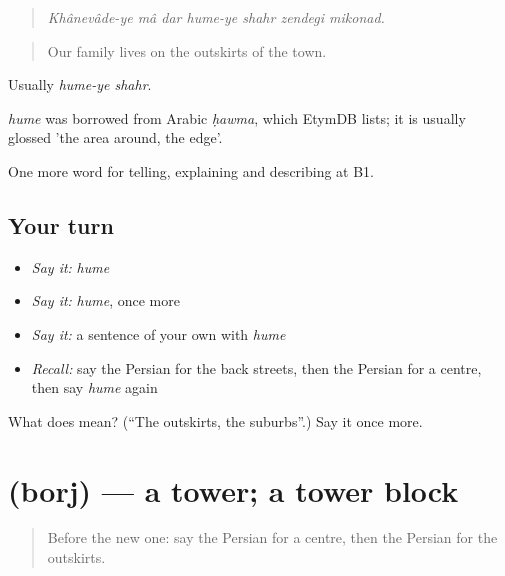 \begin{quote}
\emph{Khânevâde-ye mâ dar hume-ye shahr zendegi mikonad.}
\end{quote}

\begin{quote}
Our family lives on the outskirts of the town.
\end{quote}

Usually \emph{hume-ye shahr}.

\begin{cousinweb}
\emph{hume} was borrowed from Arabic \emph{ḥawma}, which EtymDB lists; it is usually glossed 'the area around, the edge'.
\end{cousinweb}

\begin{grammarlens}[title={What you've built}]
One more word for telling, explaining and describing at B1.
\end{grammarlens}

\subsection*{Your turn}
\begin{itemize}
\raggedright
  \item \emph{Say it:} \emph{hume}
  \item \emph{Say it:} \emph{hume}, once more
  \item \emph{Say it:} a sentence of your own with \emph{hume}
  \item \emph{Recall:} say the Persian for the back streets, then the Persian for a centre, then say \emph{hume} again
\end{itemize}

\begin{tcolorbox}[breakable,colback=teal!4,colframe=teal!35!black,title={Before you move on}]
What does  mean? (\textquotedblleft{}The outskirts, the suburbs\textquotedblright{}.) Say it once more.
\end{tcolorbox}
\section[\texorpdfstring{\fa{برج} (borj)}{برج (borj)}]{ (borj) — a tower; a tower block}

\label{lesson:FA-C450-borj}



\begin{quote}
Before the new one: say the Persian for a centre, then the Persian for the outskirts.
\end{quote}

